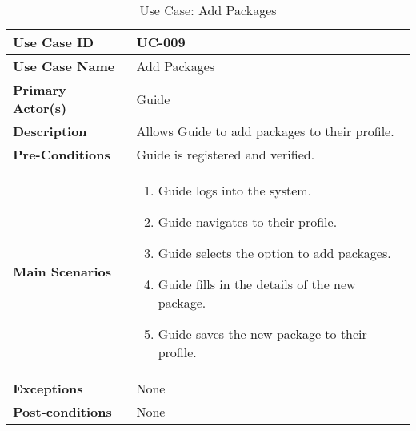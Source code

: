 \begin{table}[ht]
    \centering
    \begin{tabular}{|l|p{}|}
        \hline
        \textbf{Use Case ID} & UC-009 \\
        \hline
        \textbf{Use Case Name} & Add Packages \\
        \hline
        \textbf{Primary Actor(s)} & Guide \\
        \hline
        \textbf{Description} & Allows Guide to add packages to their profile. \\
        \hline
        \textbf{Pre-Conditions} & Guide is registered and verified. \\
        \hline
        \textbf{Main Scenarios} & 
        \begin{enumerate}[label=\arabic*.,itemsep=0pt]
            \item Guide logs into the system.
            \item Guide navigates to their profile.
            \item Guide selects the option to add packages.
            \item Guide fills in the details of the new package.
            \item Guide saves the new package to their profile.
        \end{enumerate} \\
        \hline
        \textbf{Exceptions} & None \\
        \hline
        \textbf{Post-conditions} & None \\
        \hline
    \end{tabular}
    \label{tab:use-case-add-packages}
    \caption{Use Case: Add Packages}
\end{table}


